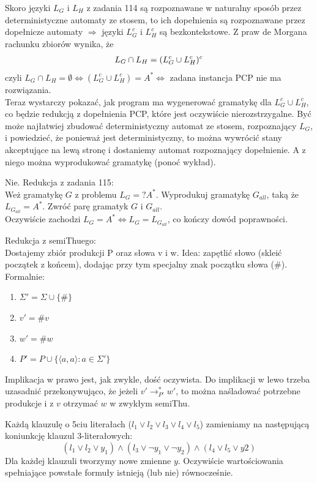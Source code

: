 \documentclass[a4paper,11pt]{article}
\newenvironment{zadanie}[1]
  {\renewcommand\theinnercustomthm{#1}\innercustomthm}
  {\endinnercustomthm}
\begin{document}
\begin{zadanie}{115}
\end{zadanie}
Skoro języki $L_G$ i $L_H$ z zadania 114 są rozpoznawane w naturalny sposób przez deterministyczne automaty ze stosem,
to ich dopełnienia są rozpoznawane przez dopełnicze automaty $\Rightarrow$ języki $L_G^c$ i $L_H^c$ są bezkontekstowe. 
Z praw de Morgana rachunku zbiorów wynika, że
\begin{align}
 L_G \cap L_H = (L_G^c \cup L_H^c)^c \notag
\end{align}
czyli $L_G \cap L_H = \emptyset  \Longleftrightarrow (L_G^c \cup L_H^c) = A^* \Longleftrightarrow $ zadana instancja PCP 
nie ma rozwiązania. \\
Teraz wystarczy pokazać, jak program ma wygenerować gramatykę dla $L_G^c \cup L_H^c$, co będzie redukcją z dopełnienia PCP,
które jest oczywiście nierozstrzygalne. Być może najłatwiej zbudować deterministyczny automat ze stosem, rozpoznający $L_G$,
i powiedzieć, że ponieważ jest deterministyczny, to można wywrócić stany akceptujące na lewą stronę i dostaniemy automat rozpoznający
dopełnienie. A z niego można wyprodukować gramatykę (ponoć wykład).

\begin{zadanie}{116}
\end{zadanie}
Nie. Redukcja z zadania 115: \\
Weż gramatykę $G$ z problemu $L_G =? A^*$. Wyprodukuj gramatykę $G_{all}$, taką że $L_{G_{all}} = A^*$. Zwróć parę gramatyk
$G$ i $G_{all}$. \\
Oczywiście zachodzi $L_G = A^* \Longleftrightarrow L_G = L_{G_{all}}$, co kończy dowód poprawności.

\begin{zadanie}{118}
\end{zadanie}
Redukcja z semiThuego: \\
Dostajemy zbiór produkcji P oraz słowa v i w. Idea: zapętlić słowo (skleić początek z końcem), dodając przy tym specjalny
znak początku słowa ($\#$). Formalnie:
\begin{enumerate}
 \item $\Sigma' = \Sigma \cup \{ \# \}$
 \item $v' = \# v$
 \item $w' = \# w$
 \item $P' = P \cup \{ \langle a , a \rangle : a \in \Sigma' \}$
\end{enumerate}
Implikacja w prawo jest, jak zwykle, dość oczywista. Do implikacji w lewo trzeba uzasadnić przekonywująco, że jeżeli 
$v' \longrightarrow_{P'}^* w'$, to można naśladować potrzebne produkcje i z $v$ otrzymać $w$ w zwykłym semiThu. 


\begin{zadanie}{143}
\end{zadanie}
Każdą klauzulę o 5ciu literałach ($l_1\vee l_2\vee l_3\vee l_4\vee l_5$) zamieniamy na następującą koniunkcję klauzul 3-literałowych: \\
$$
( l_1 \vee l_2 \vee y_1) \wedge ( l_3 \vee \neg y_1 \vee \neg y_2) \wedge ( l_4 \vee l_5 \vee y2)
$$
Dla każdej klauzuli tworzymy nowe zmienne $y$. Oczywiście wartościowania spełniające powstałe formuły istnieją (lub nie) równocześnie.
\end{document}
